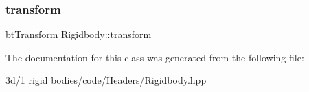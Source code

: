\subsubsection{\texorpdfstring{transform}{transform}}
{\footnotesize\ttfamily bt\+Transform Rigidbody\+::transform\hspace{0.3cm}{\ttfamily [protected]}}



The documentation for this class was generated from the following file\+:\begin{DoxyCompactItemize}
\item 
3d/1 rigid bodies/code/\+Headers/\mbox{\hyperlink{_rigidbody_8hpp}{Rigidbody.\+hpp}}\end{DoxyCompactItemize}

